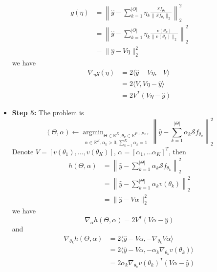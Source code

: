 \documentclass[12pt,a4paper]{article}
\DeclareMathOperator*{\argmin}{argmin}
\begin{document}
\begin{itemize}
\begin{equation}
        \begin{aligned}
        g(\eta)&= \left\| \hat{y} - \sum_{k = 1}^{|\Theta|} \eta_k \frac{\mathcal{S}f_{\theta_k}}{\|\mathcal{S}f_{\theta_k}\|_2} \right\|_2^2  \\&= \left\| \hat{y} - \sum_{k = 1}^{|\Theta|} \eta_k \frac{v(\theta_k)}{\|v(\theta_k)\|_2} \right\|_2^2
        \\&= \| \hat{y} - V\eta  \|_2^2
    \end{aligned} 
    \end{equation}
    we have 
    \begin{equation}
        \begin{aligned}
        \nabla _\eta g(\eta) &= 2\langle  \hat{y} - V\eta  , -V \rangle \\ &= 2\langle V, V\eta  - \hat{y}  \rangle \\&= 2 V^T (V\eta  - \hat{y} )
        \end{aligned}
    \end{equation}
    \item \textbf{Step 5:}
    The problem is 
    \begin{equation}
        (\Theta,\alpha) \xleftarrow{} \underset{\alpha \in \mathbb{R} ^K, \alpha_k > 0, \sum_{k=1}^K\alpha_k =1}{\argmin_{\Theta \in  \mathbb{R} ^K, \theta_k \in \mathbb{R}^{P+P\times r}}} \left\| \hat{y} - \sum_{k = 1}^{|\Theta|} \alpha_k \mathcal{S}f_{\theta_k}\right\| _2^2 
    \end{equation}
    Denote $V = [v(\theta_1),  ...,v(\theta_K)]$, $\alpha = [\alpha_1,...\alpha_K]^T$, then 
    \begin{equation}
        \begin{aligned}
        h(\Theta,\alpha)&= \left\| \hat{y} - \sum_{k = 1}^{|\Theta|} \alpha_k \mathcal{S}f_{\theta_k}\right\| _2^2 \\&= \left\| \hat{y} - \sum_{k = 1}^{|\Theta|} \alpha_k v(\theta_k)\right\| _2^2
        \\&= \| \hat{y} - V\alpha  \|_2^2
    \end{aligned} 
    \end{equation}
    we have 
    \begin{equation}
        \nabla _\alpha h(\Theta,\alpha) = 2 V^T (V\alpha  - \hat{y} )
    \end{equation}
    and 
    \begin{equation}
        \begin{aligned}
            \nabla _{\theta_k} h(\Theta,\alpha)&= 2\langle \hat{y} - V\alpha , -\nabla_{\theta_k} V\alpha \rangle \\&=  2\langle \hat{y} - V\alpha , - \alpha_k \nabla_{\theta_k} v(\theta_k) \rangle \\&= 2\alpha_k \nabla_{\theta_k} v(\theta_k)^T (V\alpha - \hat{y})
        \end{aligned}
    \end{equation}
\end{itemize}
\end{document}
